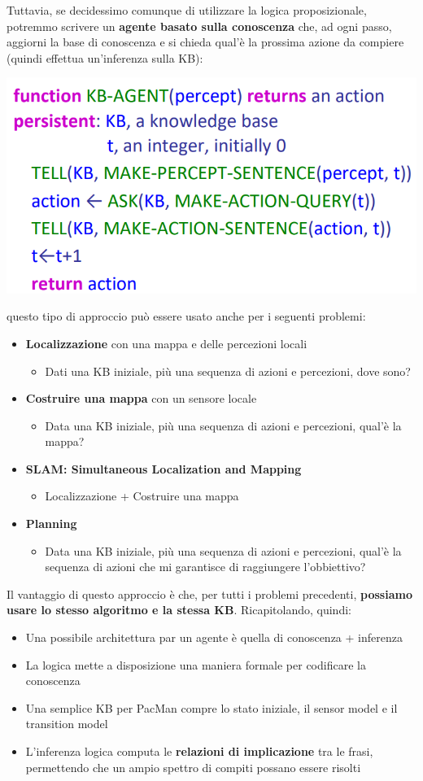 \documentclass[12pt]{article}
\begin{document}
Tuttavia, se decidessimo comunque di utilizzare la logica proposizionale, potremmo scrivere un \textbf{agente basato sulla conoscenza} che, ad ogni passo, aggiorni la base di conoscenza e si chieda qual'è la prossima azione da compiere (quindi effettua un'inferenza sulla KB):
\begin{center}
    \includegraphics[width =0.70\linewidth]{Images/52.PNG}
\end{center}
questo tipo di approccio può essere usato anche per i seguenti problemi:
\begin{itemize}
    \item \textbf{Localizzazione} con una mappa e delle percezioni locali 
    \begin{itemize}
        \item Dati una KB iniziale, più una sequenza di azioni e percezioni, dove sono?
    \end{itemize}
    \item \textbf{Costruire una mappa} con un sensore locale
    \begin{itemize}
        \item Data una KB iniziale, più una sequenza di azioni e percezioni, qual'è la mappa?
    \end{itemize}
    \item \textbf{SLAM: Simultaneous Localization and Mapping}
    \begin{itemize}
        \item Localizzazione + Costruire una mappa
    \end{itemize}
    \item \textbf{Planning}
    \begin{itemize}
        \item Data una KB iniziale, più una sequenza di azioni e percezioni, qual'è la sequenza di azioni che mi garantisce di raggiungere l'obbiettivo?
    \end{itemize}
\end{itemize}
Il vantaggio di questo approccio è che, per tutti i problemi precedenti, \textbf{possiamo usare lo stesso algoritmo e la stessa KB}.
Ricapitolando, quindi:
\begin{itemize}
    \item Una possibile architettura par un agente è quella di conoscenza + inferenza
    \item La logica mette a disposizione una maniera formale per codificare la conoscenza
    \item Una semplice KB per PacMan compre lo stato iniziale, il sensor model e il transition model
    \item L'inferenza logica computa le \textbf{relazioni di implicazione} tra le frasi, permettendo che un ampio spettro di compiti possano essere risolti
\end{itemize}
\end{document}
